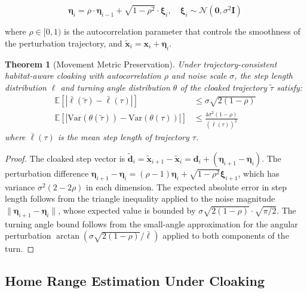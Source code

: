 \documentclass[11pt,letterpaper]{article}
\newtheorem{theorem}{Theorem}[section]
\begin{document}
\begin{equation}
\boldsymbol{\eta}_i = \rho \cdot \boldsymbol{\eta}_{i-1} + \sqrt{1 - \rho^2} \cdot \boldsymbol{\xi}_i, \quad \boldsymbol{\xi}_i \sim \mathcal{N}(\mathbf{0}, \sigma^2 \mathbf{I})
\end{equation}

where $\rho \in [0, 1)$ is the autocorrelation parameter that controls the smoothness of the perturbation trajectory, and $\tilde{\mathbf{x}}_i = \mathbf{x}_i + \boldsymbol{\eta}_i$.

\begin{theorem}[Movement Metric Preservation]
\label{thm:preservation}
Under trajectory-consistent habitat-aware cloaking with autocorrelation $\rho$ and noise scale $\sigma$, the step length distribution $\ell$ and turning angle distribution $\theta$ of the cloaked trajectory $\tilde{\tau}$ satisfy:
\begin{align}
\mathbb{E}[|\bar{\ell}(\tilde{\tau}) - \bar{\ell}(\tau)|] &\leq \sigma\sqrt{2(1-\rho)} \\
\mathbb{E}[|\text{Var}(\theta(\tilde{\tau})) - \text{Var}(\theta(\tau))|] &\leq \frac{4\sigma^2(1-\rho)}{(\bar{\ell}(\tau))^2}
\end{align}
where $\bar{\ell}(\tau)$ is the mean step length of trajectory $\tau$.
\end{theorem}

\begin{proof}
The cloaked step vector is $\tilde{\mathbf{d}}_i = \tilde{\mathbf{x}}_{i+1} - \tilde{\mathbf{x}}_i = \mathbf{d}_i + (\boldsymbol{\eta}_{i+1} - \boldsymbol{\eta}_i)$. The perturbation difference $\boldsymbol{\eta}_{i+1} - \boldsymbol{\eta}_i = (\rho - 1)\boldsymbol{\eta}_i + \sqrt{1-\rho^2}\boldsymbol{\xi}_{i+1}$, which has variance $\sigma^2(2 - 2\rho)$ in each dimension. The expected absolute error in step length follows from the triangle inequality applied to the noise magnitude $\|\boldsymbol{\eta}_{i+1} - \boldsymbol{\eta}_i\|$, whose expected value is bounded by $\sigma\sqrt{2(1-\rho)} \cdot \sqrt{\pi/2}$. The turning angle bound follows from the small-angle approximation for the angular perturbation $\arctan(\sigma\sqrt{2(1-\rho)}/\bar{\ell})$ applied to both components of the turn.
\end{proof}

\subsection{Home Range Estimation Under Cloaking}
\end{document}
